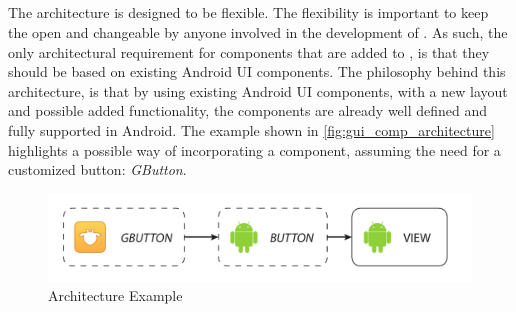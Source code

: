\subsection{\guicomponents[]}
The \guicomponents[] architecture is designed to be flexible. 
The flexibility is important to keep the \guicomponents[] open and changeable by anyone involved in the development of \giraf[]. 
As such, the only architectural requirement for components that are added to \guicomponents[], is that they should be based on existing Android UI components. 
The philosophy behind this architecture, is that by using existing Android UI components, with a new layout and possible added functionality, the components are already well defined and fully supported in Android. 
The example shown in \autoref{fig:gui_comp_architecture} highlights a possible way of incorporating a component, assuming the need for a customized button: \textit{GButton}. 
\begin{figure}[h]
	\centering
	\includegraphics[width=1\textwidth]{gfx/gui_components_architecture.pdf}
	\caption{\guicomponents[] Architecture Example}
	\label{fig:gui_comp_architecture}
\end{figure}